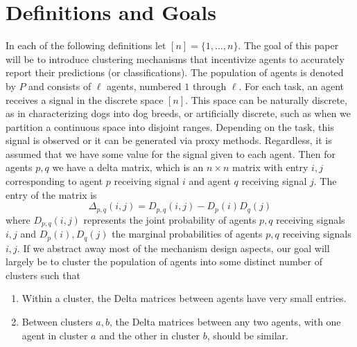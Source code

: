 \documentclass[a4paper, 12pt]{article}
\begin{document}
\section{Definitions and Goals}
In each of the following definitions let $[n] = \{1, \dots, n\}$. The goal of this paper will be to introduce clustering mechanisms that incentivize agents to accurately report their predictions (or classifications). The population of agents is denoted by $P$ and consists of $\ell$ agents, numbered $1$ through $\ell$. For each task, an agent receives a signal in the discrete space $[n]$. This space can be naturally discrete, as in characterizing dogs into dog breeds, or artificially discrete, such as when we partition a continuous space into disjoint ranges. Depending on the task, this signal is observed or it can be generated via proxy methods. Regardless, it is assumed that we have some value for the signal given to each agent. Then for agents $p,q$ we have a delta matrix, which is an $n \times n$ matrix with entry $i,j$ corresponding to agent $p$ receiving signal $i$ and agent $q$ receiving signal $j$. The entry of the matrix is $$\Delta_{p,q}(i,j) = D_{p,q}(i,j) - D_{p}(i)D_{q}(j)$$ where $D_{p,q}(i,j)$ represents the joint probability of agents $p,q$ receiving signals $i,j$ and $D_{p}(i),D_{q}(j)$ the marginal probabilities of agents $p,q$ receiving signals $i,j$. If we abstract away most of the mechanism design aspects, our goal will largely be to cluster the population of agents into some distinct number of clusters such that \begin{enumerate}
\item Within a cluster, the Delta matrices between agents have very small entries.
\item Between clusters $a,b$, the Delta matrices between any two agents, with one agent in cluster $a$ and the other in cluster $b$, should be similar.
\end{enumerate}

% 
\end{document}
